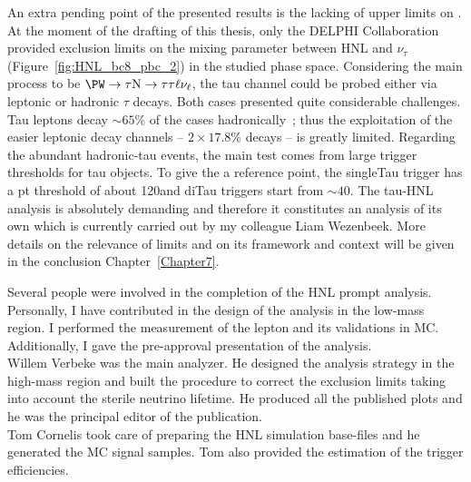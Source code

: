 An extra pending point of the presented results is the lacking of
upper limits on \mixpart. At the moment of the drafting of this
thesis, only the DELPHI Collaboration~\cite{Abreu:1996pa}  
provided exclusion limits on the mixing parameter between HNL and
$\nu_{\tau}$ (Figure~\ref{fig:HNL_bc8_pbc_2}) in the studied phase
space. Considering the main process to be
$\PW
\rightarrow \tau \hnl
\rightarrow \tau \tau \ell \nu_{\ell}$, the tau channel could be
probed either via leptonic or hadronic $\tau$ decays. Both cases
presented quite considerable challenges. Tau leptons decay $\sim 65\%$
of the cases hadronically~\cite{pdgw}; thus the exploitation of the
easier leptonic decay channels -- $2 \times 17.8\%$ decays --
is greatly limited. Regarding the abundant hadronic-tau events, the
main test comes from large \pt trigger thresholds for
tau objects. To give the a reference point, the singleTau trigger has
a pt threshold of about
120\GeV and diTau triggers start from $\sim 40$\GeV. The
tau-HNL analysis is absolutely demanding and therefore it constitutes
an analysis of its own which is currently carried out by my colleague
Liam Wezenbeek. More details on the relevance of \mixpart limits and on its
framework and context will be given in the conclusion
Chapter~\ref{Chapter7}.\\

\vspace{3cm}

Several people were involved in the completion of the HNL prompt
analysis.\\
Personally, I have contributed in the design of the analysis in the low-mass
region. I performed the measurement of the lepton \fr and its
validations in MC.\\
Additionally, I gave the pre-approval presentation of the analysis.\\
Willem Verbeke was the main analyzer. He designed the analysis strategy in the
high-mass region and built the procedure to
correct the exclusion limits taking into account the sterile neutrino
lifetime. He produced all the published plots and he was the principal
editor of the publication.\\
Tom Cornelis took care of preparing the HNL simulation base-files and
he generated the MC signal samples. Tom also provided the estimation
of the trigger efficiencies. 

